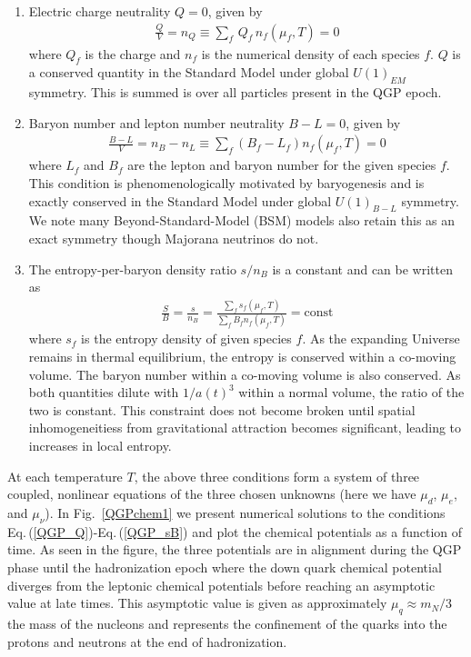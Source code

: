 \documentclass[universe,article,submit,moreauthors,pdftex,a4paper]{Definitions/mdpi}
\newcommand{\req}[1]{Eq.\,(\ref{#1})}
\newcommand*{\rf}[1]{Fig.~{\ref{#1}}}
\begin{document}
\begin{enumerate}
\item Electric charge neutrality $Q=0$, given by
\begin{align}\label{QGP_Q}
 \frac{Q}{V}=n_{Q}\equiv\sum_f\,Q_f\,n_f(\mu_f,T)=0
\end{align}
where $Q_f$ is the charge and $n_{f}$ is the numerical density of each species $f$. $Q$ is a conserved quantity in the Standard Model under global $U(1)_{EM}$ symmetry. This is summed is over all particles present in the QGP epoch.
\item Baryon number and lepton number neutrality $B-L=0$, given by
\begin{align}\label{QGP_LB}
\frac{B-L}{V}=n_{B}-n_{L}\equiv\sum_f(B_f-L_f)n_f(\mu_f,T)=0
\end{align}
where $L_f$ and $B_f$ are the lepton and baryon number for the given species $f$. This condition is phenomenologically motivated by baryogenesis and is exactly conserved in the Standard Model under global $U(1)_{B-L}$ symmetry. We note many Beyond-Standard-Model (BSM) models also retain this as an exact symmetry though Majorana neutrinos do not.
\item The entropy-per-baryon density ratio $s/n_B$ is a constant and can be written as
\begin{align}\label{QGP_sB}
\frac{S}{B}=\frac{s}{n_B}=\frac{\sum_fs_f(\mu_f,T)}{\sum_fB_fn_f(\mu_f,T)}=\mathrm{const}
\end{align}
where $s_f$ is the entropy density of given species $f$. As the expanding Universe remains in thermal equilibrium, the entropy is conserved within a co-moving volume. The baryon number within a co-moving volume is also conserved. As both quantities dilute with $1/a(t)^{3}$ within a normal volume, the ratio of the two is constant. This constraint does not become broken until spatial inhomogeneitiess from gravitational attraction becomes significant, leading to increases in local entropy.
\end{enumerate}
At each temperature $T$, the above three conditions form a system of three coupled, nonlinear equations of the three chosen unknowns (here we have $\mu_d$, $\mu_e$, and $\mu_\nu$). In \rf{QGPchem1} we present numerical solutions to the conditions \req{QGP_Q}-\req{QGP_sB} and plot the chemical potentials as a function of time. As seen in the figure, the three potentials are in alignment during the QGP phase until the hadronization epoch where the down quark chemical potential diverges from the leptonic chemical potentials before reaching an asymptotic value at late times. This asymptotic value is given as approximately $\mu_{q}\approx m_{N}/3$ the mass of the nucleons and represents the confinement of the quarks into the protons and neutrons at the end of hadronization.
\end{document}
